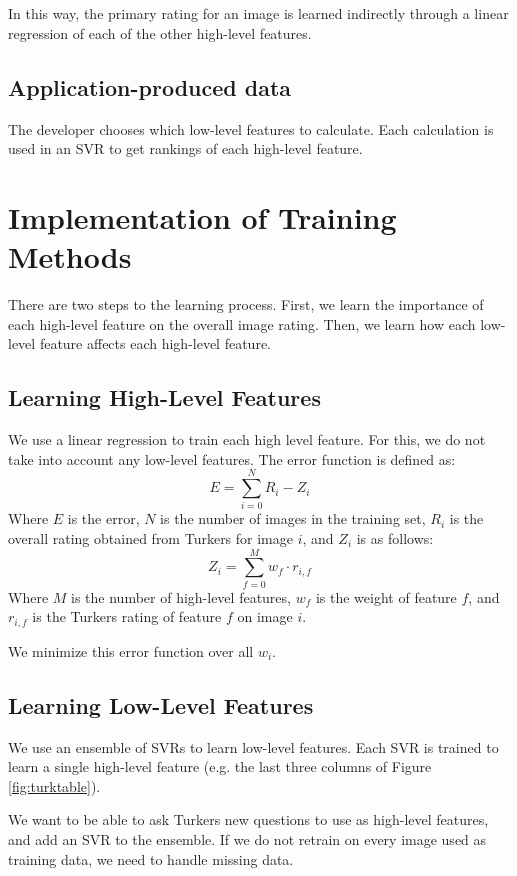 \documentclass[11pt,letter]{article}
\begin{document}
\\
\\

In this way, the primary rating for an image is learned indirectly through a linear regression of each of the other high-level features.

\subsection{Application-produced data}
The developer chooses which low-level features to calculate. Each calculation is used in an SVR to get rankings of each high-level feature.

\section{Implementation of Training Methods}
\label{methods}

There are two steps to the learning process. First, we learn the importance of each high-level feature on the overall image rating. Then, we learn how each low-level feature affects each high-level feature.

\subsection{Learning High-Level Features}
We use a linear regression to train each high level feature. For this, we do not take into account any low-level features. The error function is defined as:
\[
E=\displaystyle\sum\limits_{i=0}^N R_i-Z_i
\]
Where $E$ is the error, $N$ is the number of images in the training set, $R_i$ is the overall rating obtained from Turkers for image $i$, and $Z_i$ is as follows:
\[
Z_i=\displaystyle\sum\limits_{f=0}^M w_f \cdot r_{i,f}
\]
Where $M$ is the number of high-level features, $w_f$ is the weight of feature $f$, and $r_{i,f}$ is the Turkers rating of feature $f$ on image $i$.

We minimize this error function over all $w_i$.

\subsection{Learning Low-Level Features}
\label{llfeat}
We use an ensemble of SVRs to learn low-level features. Each SVR is trained to learn a single high-level feature (e.g. the last three columns of Figure \ref{fig:turktable}).

We want to be able to ask Turkers new questions to use as high-level features, and add an SVR to the ensemble. If we do not retrain on every image used as training data, we need to handle missing data.
\end{document}
